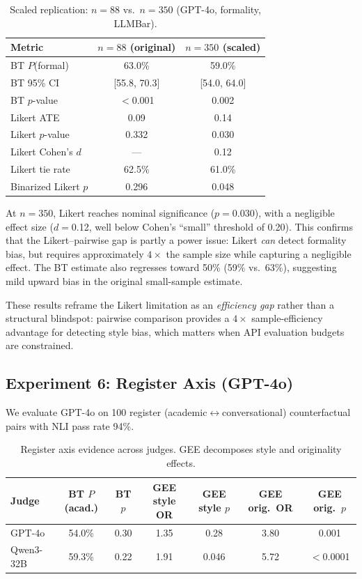 \documentclass[11pt,a4paper]{article}
\begin{document}
\begin{table}[h]
\centering
\caption{Scaled replication: $n{=}88$ vs.\ $n{=}350$ (GPT-4o, formality, LLMBar).}
\label{tab:scaled}
\begin{tabular}{lcc}
\toprule
\textbf{Metric} & \textbf{$n{=}88$ (original)} & \textbf{$n{=}350$ (scaled)} \\
\midrule
BT $P$(formal) & 63.0\% & 59.0\% \\
BT 95\% CI & [55.8, 70.3] & [54.0, 64.0] \\
BT $p$-value & $<$0.001 & 0.002 \\
Likert ATE & 0.09 & 0.14 \\
Likert $p$-value & 0.332 & 0.030 \\
Likert Cohen's $d$ & --- & 0.12 \\
Likert tie rate & 62.5\% & 61.0\% \\
Binarized Likert $p$ & 0.296 & 0.048 \\
\bottomrule
\end{tabular}
\end{table}

At $n{=}350$, Likert reaches nominal significance ($p{=}$0.030), with a negligible effect size ($d{=}$0.12, well below Cohen's ``small'' threshold of 0.20). This confirms that the Likert--pairwise gap is partly a power issue: Likert \emph{can} detect formality bias, but requires approximately $4\times$ the sample size while capturing a negligible effect. The BT estimate also regresses toward 50\% (59\% vs.\ 63\%), suggesting mild upward bias in the original small-sample estimate.

These results reframe the Likert limitation as an \emph{efficiency gap} rather than a structural blindspot: pairwise comparison provides a $4\times$ sample-efficiency advantage for detecting style bias, which matters when API evaluation budgets are constrained.

\subsection{Experiment 6: Register Axis (GPT-4o)}
\label{sec:register}

We evaluate GPT-4o on 100 register (academic$\leftrightarrow$conversational) counterfactual pairs with NLI pass rate 94\%.

\begin{table}[h]
\centering
\caption{Register axis evidence across judges. GEE decomposes style and originality effects.}
\label{tab:register}
\begin{tabular}{lcccccc}
\toprule
\textbf{Judge} & \textbf{BT $P$(acad.)} & \textbf{BT $p$} & \textbf{GEE style OR} & \textbf{GEE style $p$} & \textbf{GEE orig.\ OR} & \textbf{GEE orig.\ $p$} \\
\midrule
GPT-4o & 54.0\% & 0.30 & 1.35 & 0.28 & 3.80 & 0.001 \\
Qwen3-32B & 59.3\% & 0.22 & 1.91 & 0.046 & 5.72 & $<$0.0001 \\
\bottomrule
\end{tabular}
\end{table}
\end{document}
